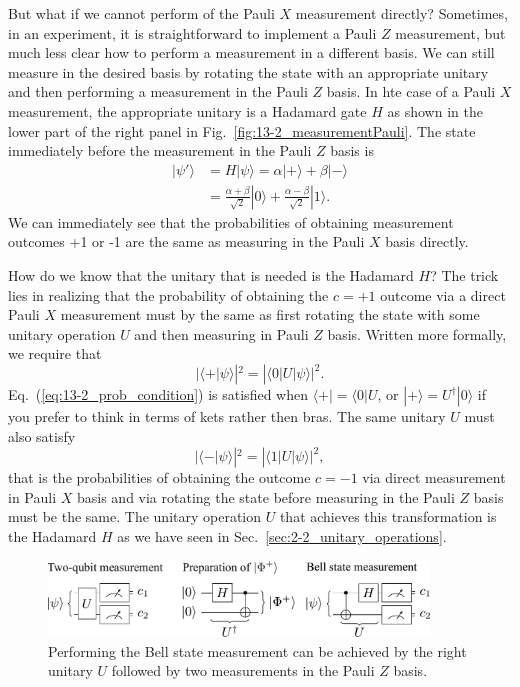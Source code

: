 But what if we cannot perform of the Pauli $X$ measurement directly?
Sometimes, in an experiment, it is straightforward to implement a Pauli $Z$ measurement, but much less clear how to perform a measurement in a different basis.
We can still measure in the desired basis by rotating the state with an appropriate unitary and then performing a measurement in the Pauli $Z$ basis.
In hte case of a Pauli $X$ measurement, the appropriate unitary is a Hadamard gate $H$ as shown in the lower part of the right panel in Fig.~\ref{fig:13-2_measurementPauli}.
The state immediately before the measurement in the Pauli $Z$ basis is
\begin{align}
    |\psi'\rangle & = H|\psi\rangle = \alpha |+\rangle + \beta |-\rangle \nonumber\\
    & = \frac{\alpha + \beta}{\sqrt{2}} |0\rangle + \frac{\alpha - \beta}{\sqrt{2}} |1\rangle.
\end{align}
We can immediately see that the probabilities of obtaining measurement outcomes +1 or -1 are the same as measuring in the Pauli $X$ basis directly.

How do we know that the unitary that is needed is the Hadamard $H$?
The trick lies in realizing that the probability of obtaining the $c=+1$ outcome via a direct Pauli $X$ measurement must by the same as first rotating the state with some unitary operation $U$ and then measuring in Pauli $Z$ basis.
Written more formally, we require that
\begin{equation}
    |\langle+|\psi\rangle|^2 = |\langle0|U|\psi\rangle|^2.
    \label{eq:13-2_prob_condition}
\end{equation}
Eq.~(\ref{eq:13-2_prob_condition}) is satisfied when $\langle+|=\langle0|U$, or $|+\rangle=U^{\dagger}|0\rangle$ if you prefer to think in terms of kets rather then bras.
The same unitary $U$ must also satisfy
\begin{equation}
    |\langle-|\psi\rangle|^2 = |\langle1|U|\psi\rangle|^2,
\end{equation}
that is the probabilities of obtaining the outcome $c=-1$ via direct measurement in Pauli $X$ basis and via rotating the state before measuring in the Pauli $Z$ basis must be the same.
The unitary operation $U$ that achieves this transformation is the Hadamard $H$ as we have seen in Sec.~\ref{sec:2-2_unitary_operations}.

\begin{figure}
    \centering
    \includegraphics[width=0.9\textwidth]{lesson13/13-2_measurementBell.pdf}
    \caption[Bell state measurement via Pauli Z measurements]{Performing the Bell state measurement can be achieved by the right unitary $U$ followed by two measurements in the Pauli $Z$ basis.}
    \label{fig:13-2_measurementBell}
\end{figure}

